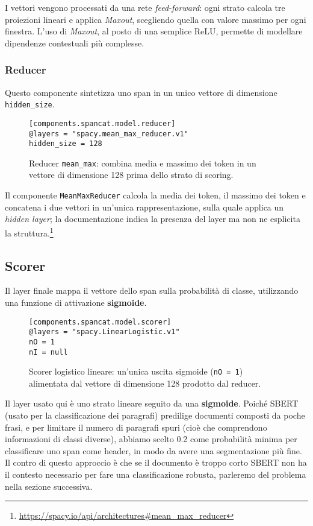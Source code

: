 \noindent I vettori vengono processati da una rete \textit{feed-forward}: ogni strato calcola tre proiezioni lineari e applica \textit{Maxout}, scegliendo quella con valore massimo per ogni finestra. L'uso di \textit{Maxout}, al posto di una semplice ReLU, permette di modellare dipendenze contestuali più complesse.
\subsubsection{Reducer}

\noindent Questo componente sintetizza uno span in un unico vettore di dimensione \texttt{hidden\_size}.

\begin{figure}[H]
    \centering
    \scriptsize
\begin{lstlisting}[style=cmd]
[components.spancat.model.reducer]
@layers = "spacy.mean_max_reducer.v1"
hidden_size = 128
\end{lstlisting}
    \caption{Reducer \texttt{mean\_max}: combina media e massimo dei token in un vettore di dimensione 128 prima dello strato di scoring.}
    \label{fig:cfg-reducer}
\end{figure}

\noindent Il componente \texttt{MeanMaxReducer} calcola la media dei token, il massimo dei token e concatena i due vettori in un'unica rappresentazione, sulla quale applica un \textit{hidden layer}; la documentazione indica la presenza del layer ma non ne esplicita la struttura.\footnote{\url{https://spacy.io/api/architectures\#mean\_max\_reducer}}
\subsection{Scorer}

\noindent Il layer finale mappa il vettore dello span sulla probabilità di classe, utilizzando una funzione di attivazione \textbf{sigmoide}.

\begin{figure}[H]
    \centering
    \scriptsize
\begin{lstlisting}[style=cmd]
[components.spancat.model.scorer]
@layers = "spacy.LinearLogistic.v1"
nO = 1
nI = null
\end{lstlisting}
    \caption{Scorer logistico lineare: un'unica uscita sigmoide (\texttt{nO = 1}) alimentata dal vettore di dimensione 128 prodotto dal reducer.}
    \label{fig:cfg-scorer}
\end{figure}
Il layer usato qui è uno strato lineare seguito da una \textbf{sigmoide}.
Poiché SBERT (usato per la classificazione dei paragrafi) predilige documenti composti da poche frasi, e per limitare il numero di paragrafi spuri (cioè che comprendono informazioni di classi diverse), abbiamo scelto 0.2 come probabilità minima per classificare uno span come header, in modo da avere una segmentazione più fine.
Il contro di questo approccio è che se il documento è troppo corto SBERT non ha il contesto necessario per fare una classificazione robusta, parleremo del problema nella sezione successiva.

